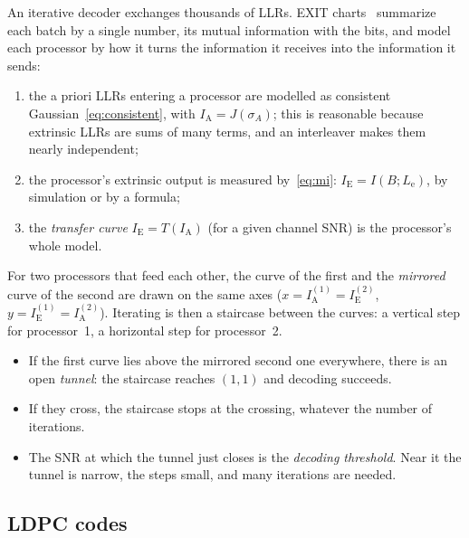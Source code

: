 \documentclass[11pt,a4paper]{article}
\newcommand{\Le}{L_{\mathrm{e}}}
\newcommand{\IA}{I_{\mathrm{A}}}
\newcommand{\IE}{I_{\mathrm{E}}}
\theoremstyle{definition}
\theoremstyle{remark}
\begin{document}
An iterative decoder exchanges thousands of LLRs. EXIT charts~\cite{tenbrink,hagenauerexit} summarize each batch by a single number, its mutual information with the bits, and model each processor by how it turns the information it receives into the information it sends:
\begin{enumerate}[leftmargin=*]
  \item the a priori LLRs entering a processor are modelled as consistent Gaussian~\eqref{eq:consistent}, with $\IA = J(\sigma_A)$; this is reasonable because extrinsic LLRs are sums of many terms, and an interleaver makes them nearly independent;
  \item the processor's extrinsic output is measured by~\eqref{eq:mi}: $\IE = I(B;\Le)$, by simulation or by a formula;
  \item the \emph{transfer curve} $\IE = T(\IA)$ (for a given channel SNR) is the processor's whole model.
\end{enumerate}
For two processors that feed each other, the curve of the first and the \emph{mirrored} curve of the second are drawn on the same axes ($x = \IA^{(1)} = \IE^{(2)}$, $y = \IE^{(1)} = \IA^{(2)}$). Iterating is then a staircase between the curves: a vertical step for processor~1, a horizontal step for processor~2.
\begin{itemize}[leftmargin=*]
  \item If the first curve lies above the mirrored second one everywhere, there is an open \emph{tunnel}: the staircase reaches $(1,1)$ and decoding succeeds.
  \item If they cross, the staircase stops at the crossing, whatever the number of iterations.
  \item The SNR at which the tunnel just closes is the \emph{decoding threshold}. Near it the tunnel is narrow, the steps small, and many iterations are needed.
\end{itemize}

\subsection{LDPC codes}
\end{document}

